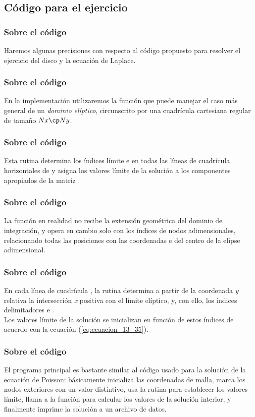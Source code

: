 \subsection*{Código para el ejercicio}
\begin{frame}
\frametitle{Sobre el código}
Haremos algunas precisiones con respecto al código propuesto para resolver el ejercicio del disco y la ecuación de Laplace.
\end{frame}
\begin{frame}
\frametitle{Sobre el código}
En la implementación utilizaremos la función  que puede manejar el caso más general de un \emph{dominio elíptico}, circunscrito por una cuadrícula cartesiana regular de tamaño $Nx \cp Ny$.
\end{frame}
\begin{frame}
\frametitle{Sobre el código}
Esta rutina determina los índices límite  e  en todas las líneas de cuadrícula horizontales de  y asigna los valores límite de la solución a los componentes apropiados de la matriz .
\end{frame}
\begin{frame}
\frametitle{Sobre el código}
La función  en realidad no recibe la extensión geométrica del dominio de integración, y opera en cambio solo con los índices de nodos adimensionales, relacionando todas las posiciones con las coordenadas  e  del centro de la elipse adimensional.
\end{frame}
\begin{frame}
\frametitle{Sobre el código}
En cada línea de cuadrícula , la rutina determina a partir de la coordenada \emph{y} relativa  la intersección \emph{x} positiva con el límite elíptico,  y, con ello, los índices delimitadores  e . 
\\
\bigskip
\pause
Los valores límite de la solución se inicializan en función de estos índices de acuerdo con la ecuación (\ref{eq:ecuacion_13_35}).
\end{frame}
\begin{frame}
\frametitle{Sobre el código}
El programa principal es bastante similar al código usado para la solución de la ecuación de Poisson: básicamente inicializa las coordenadas de malla, marca los nodos exteriores con un valor distintivo, usa la rutina  para establecer los valores límite, llama a la función  para calcular los valores de la solución interior, y finalmente imprime la solución a un archivo de datos.
\end{frame}
